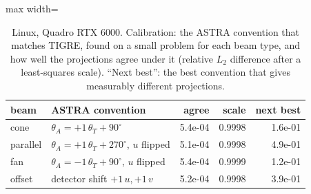 \begin{table}[H]
\centering
\caption{Linux, Quadro RTX 6000. Calibration: the ASTRA convention that matches TIGRE, found on a small problem for each beam type, and how well the projections agree under it (relative $L_2$ difference after a least-squares scale). ``Next best'': the best convention that gives measurably different projections.}
\label{tab:lin-calib}
\small
\begin{adjustbox}{max width=\linewidth}
\begin{tabular}{llrrr}
\toprule
beam & ASTRA convention & agree & scale & next best\\
\midrule
cone & $\theta_A = +1\,\theta_T +90^\circ$ & 5.4e-04 & 0.9998 & 1.6e-01\\
parallel & $\theta_A = +1\,\theta_T +270^\circ$, $u$ flipped & 5.1e-04 & 0.9998 & 4.9e-01\\
fan & $\theta_A = -1\,\theta_T +90^\circ$, $u$ flipped & 5.4e-04 & 0.9999 & 1.2e-01\\
offset & detector shift $+1\,u, +1\,v$ & 5.2e-04 & 0.9998 & 3.9e-01\\
\bottomrule
\end{tabular}
\end{adjustbox}
\end{table}
